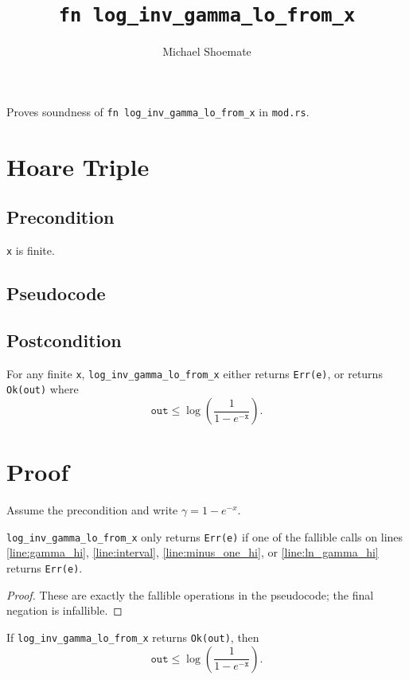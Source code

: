 \documentclass{article}
\title{\texttt{fn log\_inv\_gamma\_lo\_from\_x}}
\author{Michael Shoemate}
\begin{document}
\maketitle

Proves soundness of \texttt{fn log\_inv\_gamma\_lo\_from\_x} in \texttt{mod.rs}.

\section{Hoare Triple}
\subsection*{Precondition}
\texttt{x} is finite.

\subsection*{Pseudocode}


\subsection*{Postcondition}
\begin{theorem}
\label{postcondition}
For any finite \texttt{x}, \texttt{log\_inv\_gamma\_lo\_from\_x} either returns \texttt{Err(e)},
or returns \texttt{Ok(out)} where
\[
\texttt{out} \le \log\!\left(\frac{1}{1 - e^{-\texttt{x}}}\right).
\]
\end{theorem}

\section{Proof}
Assume the precondition and write $\gamma = 1 - e^{-x}$.

\begin{lemma}
\label{err-e}
\texttt{log\_inv\_gamma\_lo\_from\_x} only returns \texttt{Err(e)} if one of the fallible calls
on lines \ref{line:gamma_hi}, \ref{line:interval}, \ref{line:minus_one_hi}, or
\ref{line:ln_gamma_hi} returns \texttt{Err(e)}.
\end{lemma}

\begin{proof}
These are exactly the fallible operations in the pseudocode; the final negation is infallible.
\end{proof}

\begin{lemma}
\label{ok-out}
If \texttt{log\_inv\_gamma\_lo\_from\_x} returns \texttt{Ok(out)}, then
\[
\texttt{out} \le \log\!\left(\frac{1}{1 - e^{-\texttt{x}}}\right).
\]
\end{lemma}
\end{document}
